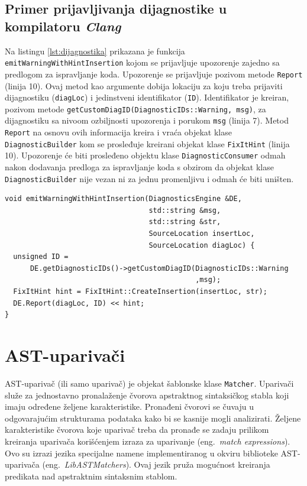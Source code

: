\documentclass[12pt,oneside]{memoir}
\begin{document}
\subsection{Primer prijavljivanja dijagnostike u kompilatoru \textit{Clang}}

Na listingu \ref{lst:dijagnostika} prikazana je funkcija \texttt{emitWarningWithHintInsertion} kojom se prijavljuje
upozorenje zajedno sa predlogom za ispravljanje koda. Upozorenje se prijavljuje pozivom metode \texttt{Report} (linija 10). Ovaj metod kao argumente
dobija lokaciju za koju treba prijaviti dijagnostiku (\texttt{diagLoc}) i jedinstveni identifikator (\texttt{ID}). Identifikator je kreiran, pozivom metode \texttt{getCustomDiagID(DiagnosticIDs\-::Warning, msg)}, za dijagnostiku sa nivoom ozbiljnosti upozorenja i porukom \texttt{msg} (linija 7). Metod \texttt{Report} na osnovu ovih informacija kreira i vra\'{c}a
objekat klase \texttt{DiagnosticBui\-lder} kom se prosleđuje kreirani objekat klase \texttt{FixItHint} (linija 10). Upozorenje \'{c}e biti prosleđeno
objektu klase \texttt{DiagnosticConsumer} odmah nakon dodavanja predloga za ispravljanje koda s obzirom da objekat klase \texttt{DiagnosticBuilder}
nije vezan ni za jednu promenljivu i odmah \'{c}e biti uni\v{s}ten.

\begin{lstlisting}[style=customc, caption={Primer prijavljivanja dijagnostike u kompilatoru \textit{Clang}.}, label=lst:dijagnostika]
void emitWarningWithHintInsertion(DiagnosticsEngine &DE, 
                                  std::string &msg,
                                  std::string &str, 
                                  SourceLocation insertLoc,
                                  SourceLocation diagLoc) {
  unsigned ID =
      DE.getDiagnosticIDs()->getCustomDiagID(DiagnosticIDs::Warning
                                             ,msg);
  FixItHint hint = FixItHint::CreateInsertion(insertLoc, str);
  DE.Report(diagLoc, ID) << hint;
}
\end{lstlisting}

\section{AST-upariva\v{c}i}
\label{sec:matchers}

AST-upariva\v{c} (ili samo upariva\v{c}) je objekat \v{s}ablonske klase \texttt{Matcher}. Upariva\v{c}i slu\v{z}e za jednostavno
pronala\v{z}enje \v{c}vorova apstraktnog sintaksi\v{c}kog stabla koji imaju određene \v{z}eljene karakteristike. Pronađeni \v{c}vorovi se 
\v{c}uvaju u odgovaraju\'{c}im strukturama podataka kako bi se kasnije mogli analizirati. \v{Z}eljene karakteristike \v{c}vorova koje upariva\v{c} treba da pronađe se zadaju prilikom kreiranja upariva\v{c}a kori\v{s}\'{c}enjem izraza za uparivanje (eng.~\textit{match expressions}).
Ovo su izrazi jezika specijalne namene implementiranog u okviru biblioteke AST-upariva\v{c}a (eng.~\textit{LibASTMatchers}). Ovaj jezik pru\v{z}a mogu\'{c}nost kreiranja predikata nad apstraktnim sintaksnim stablom.
\end{document}
